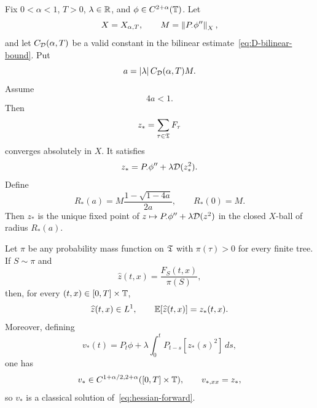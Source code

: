 \begin{theorem}
\label{thm:cprime}
Fix $0<\alpha<1$, $T>0$, $\lambda\in\mathbb R$, and $\phi\in C^{2+\alpha}(\mathbb T)$. Let
\begin{equation*}
  X=X_{\alpha,T},
  \qquad
  M=\left\lVert P_\cdot\phi''\right\rVert_{X},
\end{equation*}
and let $C_{\mathcal D}(\alpha,T)$ be a valid constant in the bilinear estimate~\eqref{eq:D-bilinear-bound}. Put
\begin{equation*}
  a
  =
  \left|\lambda\right| C_{\mathcal D}(\alpha,T)M.
\end{equation*}
Assume
\begin{equation}
  4a<1.
  \label{eq:Cprime-smallness}
\end{equation}
Then
\begin{equation}
  z_*
  =
  \sum_{\tau\in\mathfrak T}F_\tau
  \label{eq:Cprime-series}
\end{equation}
converges absolutely in $X$. It satisfies
\begin{equation*}
  z_*
  =
  P_\cdot\phi''
  +\lambda\mathcal D(z_*^2).
\end{equation*}
Define
\begin{equation*}
  R_*(a)
  =
  M\frac{1-\sqrt{1-4a}}{2a},
  \qquad
  R_*(0)=M.
\end{equation*}
Then $z_*$ is the unique fixed point of $z\mapsto P_\cdot\phi''+\lambda\mathcal D(z^2)$ in the closed $X$-ball of radius $R_*(a)$.

Let $\pi$ be any probability mass function on $\mathfrak T$ with $\pi(\tau)>0$ for every finite tree. If $S\sim\pi$ and
\begin{equation}
  \widehat z(t,x)
  =
  \frac{F_S(t,x)}{\pi(S)},
  \label{eq:Cprime-estimator}
\end{equation}
then, for every $(t,x)\in[0,T]\times\mathbb T$,
\begin{equation*}
  \widehat z(t,x)\in L^1,
  \qquad
  \mathbb E[\widehat z(t,x)]=z_*(t,x).
\end{equation*}
Moreover, defining
\begin{equation*}
  v_*(t)
  =
  P_t\phi
  +\lambda\int_0^tP_{t-s}[z_*(s)^2]\,ds,
\end{equation*}
one has
\begin{equation*}
  v_*\in C^{1+\alpha/2,2+\alpha}([0,T]\times\mathbb T),
  \qquad
  v_{*,xx}=z_*,
\end{equation*}
so $v_*$ is a classical solution of~\eqref{eq:hessian-forward}.
\end{theorem}

